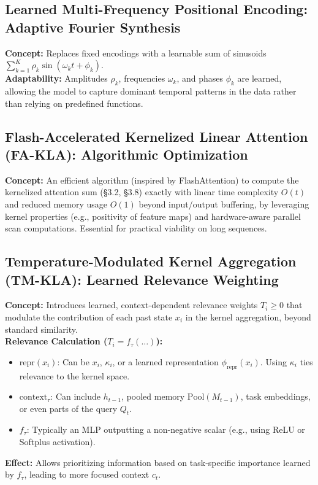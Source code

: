 \documentclass{article}
\begin{document}
\subsection{Learned Multi-Frequency Positional Encoding: Adaptive Fourier Synthesis}
\textbf{Concept:} Replaces fixed encodings with a learnable sum of sinusoids $\sum_{k=1}^K \rho_k \sin(\omega_k t + \phi_k)$. \\
\textbf{Adaptability:} Amplitudes $\rho_k$, frequencies $\omega_k$, and phases $\phi_k$ are learned, allowing the model to capture dominant temporal patterns in the data rather than relying on predefined functions.

\subsection{Flash-Accelerated Kernelized Linear Attention (FA-KLA): Algorithmic Optimization}
\textbf{Concept:} An efficient algorithm (inspired by FlashAttention) to compute the kernelized attention sum (\S3.2, \S3.8) exactly with linear time complexity $O(t)$ and reduced memory usage $O(1)$ beyond input/output buffering, by leveraging kernel properties (e.g., positivity of feature maps) and hardware-aware parallel scan computations. Essential for practical viability on long sequences.

\subsection{Temperature-Modulated Kernel Aggregation (TM-KLA): Learned Relevance Weighting}
\textbf{Concept:} Introduces learned, context-dependent relevance weights $T_i \ge 0$ that modulate the contribution of each past state $x_i$ in the kernel aggregation, beyond standard similarity. \\
\textbf{Relevance Calculation ($T_i = f_\tau(\dots)$):} %
\begin{itemize}
    \item $\text{repr}(x_i)$: Can be $x_i$, $\kappa_i$, or a learned representation $\phi_{\text{repr}}(x_i)$. Using $\kappa_i$ ties relevance to the kernel space.
    \item $\text{context}_\tau$: Can include $h_{t-1}$, pooled memory $\text{Pool}(M_{t-1})$, task embeddings, or even parts of the query $Q_t$.
    \item $f_\tau$: Typically an MLP outputting a non-negative scalar (e.g., using ReLU or Softplus activation).
\end{itemize}
\textbf{Effect:} Allows prioritizing information based on task-specific importance learned by $f_\tau$, leading to more focused context $c_t$.
\end{document}
